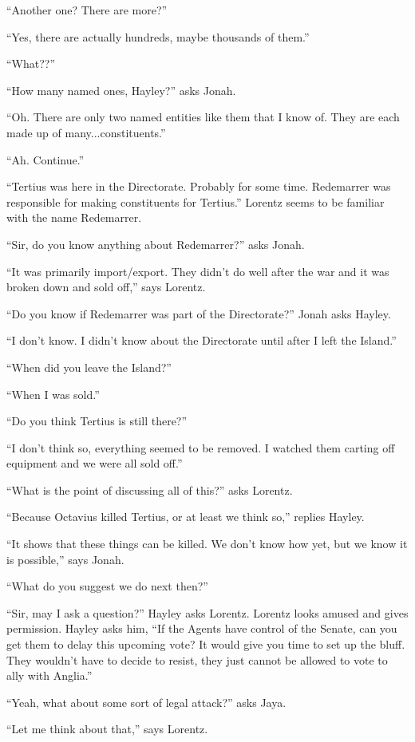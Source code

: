 ``Another one?  There are more?''

``Yes, there are actually hundreds, maybe thousands of them.''

``What??''

``How many named ones, Hayley?'' asks Jonah.

``Oh. There are only two named entities like them that I know of.  They are each made up of many...constituents.''

``Ah.  Continue.''

``Tertius was here in the Directorate.  Probably for some time.  Redemarrer was responsible for making constituents for Tertius.''   Lorentz seems to be familiar with the name Redemarrer.

``Sir, do you know anything about Redemarrer?'' asks Jonah.

``It was primarily import/export.  They didn't do well after the war and it was broken down and sold off,'' says Lorentz.

``Do you know if Redemarrer was part of the Directorate?'' Jonah asks Hayley.

``I don't know.  I didn't know about the Directorate until after I left the Island.''

``When did you leave the Island?''

``When I was sold.''

``Do you think Tertius is still there?''

``I don't think so, everything seemed to be removed.  I watched them carting off equipment and we were all sold off.''

``What is the point of discussing all of this?'' asks Lorentz.

``Because Octavius killed Tertius, or at least we think so,'' replies Hayley.

``It shows that these things can be killed.  We don't know how yet, but we know it is possible,'' says Jonah.

``What do you suggest we do next then?''

``Sir, may I ask a question?'' Hayley asks Lorentz.  Lorentz looks amused and gives permission.  Hayley asks him, ``If the Agents have control of the Senate, can you get them to delay this upcoming vote?  It would give you time to set up the bluff.  They wouldn't have to decide to resist, they just cannot be allowed to vote to ally with Anglia.''

``Yeah, what about some sort of legal attack?'' asks Jaya.

``Let me think about that,'' says Lorentz.

